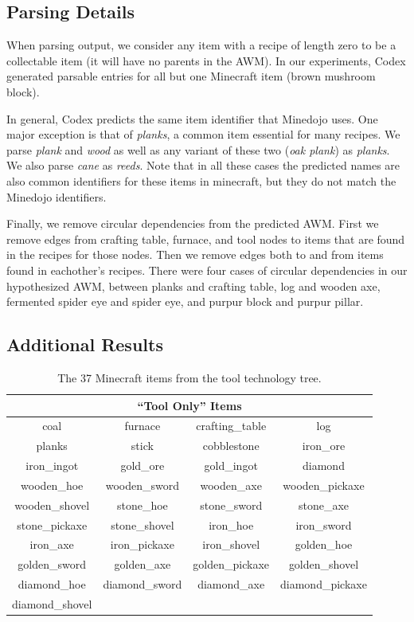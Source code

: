 \documentclass[nohyperref]{article}
\theoremstyle{plain}
\theoremstyle{definition}
\theoremstyle{remark}
\begin{document}
\subsection{Parsing Details}

When parsing output, we consider any item with a recipe of length zero to be a collectable item (it will have no parents in the AWM).
In our experiments, Codex generated parsable entries for all but one Minecraft item (brown mushroom block).

In general, Codex predicts the same item identifier that Minedojo \cite{fanminedojo} uses.
One major exception is that of \emph{planks}, a common item essential for many recipes.
We parse \emph{plank} and \emph{wood} as well as any variant of these two (\emph{oak plank}) as \emph{planks}.
We also parse \emph{cane} as \emph{reeds}.
Note that in all these cases the predicted names are also common identifiers for these items in minecraft, but they do not match the Minedojo identifiers.

Finally, we remove circular dependencies from the predicted AWM.
First we remove edges from crafting table, furnace, and tool nodes to items that are found in the recipes for those nodes.
Then we remove edges both to and from items found in eachother's recipes.
There were four cases of circular dependencies in our hypothesized AWM, between planks and crafting table, log and wooden axe, fermented spider eye and spider eye, and purpur block and purpur pillar.

\subsection{Additional Results}

\begin{table}[h]
    \centering
    \begin{tabular}{cccc}
        \multicolumn{4}{c}{``Tool Only'' Items} \\
        \hline
        coal & furnace & crafting\_table & log \\
        planks & stick & cobblestone & iron\_ore \\
        iron\_ingot & gold\_ore & gold\_ingot & diamond \\
        wooden\_hoe & wooden\_sword & wooden\_axe & wooden\_pickaxe \\
        wooden\_shovel & stone\_hoe & stone\_sword & stone\_axe \\
        stone\_pickaxe & stone\_shovel & iron\_hoe & iron\_sword \\
        iron\_axe & iron\_pickaxe & iron\_shovel & golden\_hoe \\
        golden\_sword & golden\_axe & golden\_pickaxe & golden\_shovel \\
        diamond\_hoe & diamond\_sword & diamond\_axe & diamond\_pickaxe \\
        diamond\_shovel &  &  &  
    \end{tabular}
    \caption{The 37 Minecraft items from the tool technology tree.}
\end{table}
\end{document}
